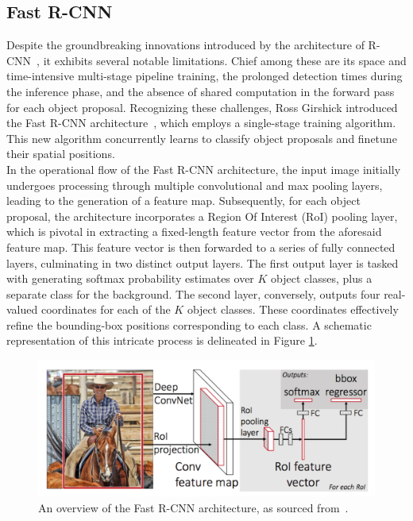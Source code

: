 \subsection{Fast R-CNN}
Despite the groundbreaking innovations introduced by the architecture of R-CNN~\cite{DBLP:journals/corr/GirshickDDM13}, it exhibits several notable limitations. Chief among these are its space and time-intensive multi-stage pipeline training, the prolonged detection times during the inference phase, and the absence of shared computation in the forward pass for each object proposal. Recognizing these challenges, Ross Girshick introduced the Fast R-CNN architecture~\cite{DBLP:journals/corr/Girshick15}, which employs a single-stage training algorithm. This new algorithm concurrently learns to classify object proposals and finetune their spatial positions.\\

In the operational flow of the Fast R-CNN architecture, the input image initially undergoes processing through multiple convolutional and max pooling layers, leading to the generation of a feature map. Subsequently, for each object proposal, the architecture incorporates a Region Of Interest (RoI) pooling layer, which is pivotal in extracting a fixed-length feature vector from the aforesaid feature map. This feature vector is then forwarded to a series of fully connected layers, culminating in two distinct output layers. The first output layer is tasked with generating softmax probability estimates over $K$ object classes, plus a separate class for the background. The second layer, conversely, outputs four real-valued coordinates for each of the $K$ object classes. These coordinates effectively refine the bounding-box positions corresponding to each class. A schematic representation of this intricate process is delineated in Figure \ref{fig:fast-rcnn}.

\begin{figure}[htb]
    \centering
    \includegraphics[width=0.7\linewidth]{figures/chapters-imgs/30/fast-rcnn.png}
    \caption{An overview of the Fast R-CNN architecture, as sourced from~\cite{DBLP:journals/corr/Girshick15}.}
    \label{fig:fast-rcnn}
\end{figure}

